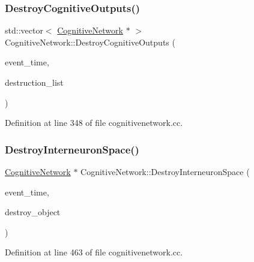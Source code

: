 \subsubsection{\texorpdfstring{Destroy\+Cognitive\+Outputs()}{DestroyCognitiveOutputs()}}
{\footnotesize\ttfamily std\+::vector$<$ \mbox{\hyperlink{class_cognitive_network}{Cognitive\+Network}} $\ast$ $>$ Cognitive\+Network\+::\+Destroy\+Cognitive\+Outputs (\begin{DoxyParamCaption}\item[{std\+::chrono\+::time\+\_\+point$<$ \mbox{\hyperlink{universe_8h_a0ef8d951d1ca5ab3cfaf7ab4c7a6fd80}{Clock}} $>$}]{event\+\_\+time,  }\item[{std\+::vector$<$ \mbox{\hyperlink{class_cognitive_network}{Cognitive\+Network}} $\ast$$>$}]{destruction\+\_\+list }\end{DoxyParamCaption})}



Definition at line 348 of file cognitivenetwork.\+cc.

\mbox{\label{class_cognitive_network_acdda154177d3b3a92885c10f6b3dc274}} 
\subsubsection{\texorpdfstring{Destroy\+Interneuron\+Space()}{DestroyInterneuronSpace()}}
{\footnotesize\ttfamily \mbox{\hyperlink{class_cognitive_network}{Cognitive\+Network}} $\ast$ Cognitive\+Network\+::\+Destroy\+Interneuron\+Space (\begin{DoxyParamCaption}\item[{std\+::chrono\+::time\+\_\+point$<$ \mbox{\hyperlink{universe_8h_a0ef8d951d1ca5ab3cfaf7ab4c7a6fd80}{Clock}} $>$}]{event\+\_\+time,  }\item[{\mbox{\hyperlink{class_cognitive_network}{Cognitive\+Network}} $\ast$}]{destroy\+\_\+object }\end{DoxyParamCaption})}



Definition at line 463 of file cognitivenetwork.\+cc.

\mbox{\label{class_cognitive_network_a718833496332e0471186c9a886005c4a}} 
